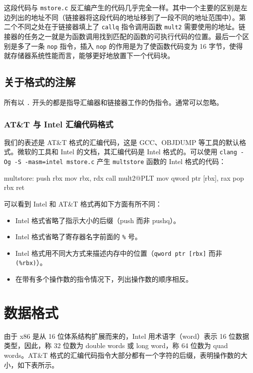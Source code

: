 这段代码与 \verb|mstore.c| 反汇编产生的代码几乎完全一样。其中一个主要的区别是左边列出的地址不同（链接器将这段代码的地址移到了一段不同的地址范围中）。第二个不同之处在于链接器填上了 \verb|callq| 指令调用函数 \verb|mult2| 需要使用的地址。链接器的任务之一就是为函数调用找到匹配的函数的可执行代码的位置。最后一个区别是多了一条 \verb|nop| 指令，插入 \verb|nop| 的作用是为了使函数代码变为 16 字节，使得就存储器系统性能而言，能够更好地放置下一个代码块。

\subsection{关于格式的注解}

所有以 \verb|.| 开头的都是指导汇编器和链接器工作的伪指令。通常可以忽略。

\subsubsection{AT\&T 与 Intel 汇编代码格式}

我们的表述是 AT\&T 格式的汇编代码，这是 GCC、OBJDUMP 等工具的默认格式。微软的工具和 Intel 的文档，其汇编代码是 Intel 格式的。可以使用 \verb|clang -Og -S -masm=intel mstore.c| 产生 \verb|multstore| 函数的 Intel 格式的代码：

\begin{nasmcode}
multstore:
    push    rbx
    mov     rbx, rdx
    call    mult2@PLT
    mov     qword ptr [rbx], rax
    pop     rbx
    ret
\end{nasmcode}

可以看到 Intel 和 AT\&T 格式再如下方面有所不同：

\begin{itemize}
    \item Intel 格式省略了指示大小的后缀（push 而非 pushq）。
    \item Intel 格式省略了寄存器名字前面的 \verb|%| 号。
    \item Intel 格式用不同大方式来描述内存中的位置（\verb|qword ptr [rbx]| 而非 \verb|(%rbx)|）。
    \item 在带有多个操作数的指令情况下，列出操作数的顺序相反。
\end{itemize}

\section{数据格式}

由于 x86 是从 16 位体系结构扩展而来的，Intel 用术语字（word）表示 16 位数据类型，因此，称 32 位数为 double words 或 long word，称 64 位数为 quad words。AT\&T 格式的汇编代码指令大部分都有一个字符的后缀，表明操作数的大小，如下表所示。

